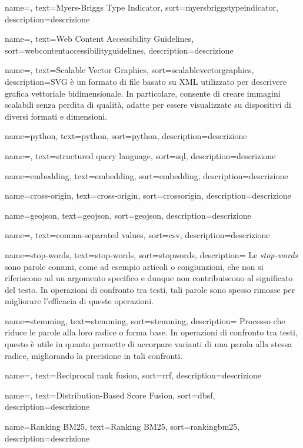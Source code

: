 {
    name=,
    text=Myers-Briggs Type Indicator,
    sort=myersbriggstypeindicator,
    description={descrizione}
}

 {
    name=,
    text=Web Content Accessibility Guidelines,
    sort=webcontentaccessibilityguidelines,
    description={descrizione}
}

 {
    name=,
    text=Scalable Vector Graphics,
    sort=scalablevectorgraphics,
    description={SVG è un formato di file basato su XML utilizzato per descrivere grafica vettoriale bidimensionale. In particolare, consente di creare immagini scalabili senza perdita di qualità, adatte per essere visualizzate su dispositivi di diversi formati e dimensioni.}
}

 {
    name=python,
    text=python,
    sort=python,
    description={descrizione}
}

 {
    name=,
    text=structured query language,
    sort=sql,
    description={descrizione}
}

 {
    name=embedding,
    text=embedding,
    sort=embedding,
    description={descrizione}
}

 {
    name=cross-origin,
    text=cross-origin,
    sort=crossorigin,
    description={descrizione}
}

 {
    name=geojson,
    text=geojson,
    sort=geojson,
    description={descrizione}
}

 {
    name=,
    text=comma-separated values,
    sort=csv,
    description={descrizione}
}

 {
    name=stop-words,
    text=stop-words,
    sort=stopwords,
    description={
        Le \emph{stop-words} sono parole comuni, come ad esempio articoli o congiunzioni, 
        che non si riferiscono ad un argomento specifico e dunque non contribuiscono al significato del testo.
        In operazioni di confronto tra testi, tali parole sono spesso rimosse per migliorare l'efficacia di queste operazioni. 
    }
}

 {
    name=stemming,
    text=stemming,
    sort=stemming,
    description={
        Processo che riduce le parole alla loro radice o forma base.
        In operazioni di confronto tra testi, questo è utile in quanto permette di accorpare varianti di una parola alla stessa radice, 
        migliorando la precisione in tali confronti.
    }
}

 {
    name=,
    text=Reciprocal rank fusion,
    sort=rrf,
    description={descrizione}
}

 {
    name=,
    text=Distribution-Based Score Fusion,
    sort=dbsf,
    description={descrizione}
}

 {
    name=Ranking BM25,
    text=Ranking BM25,
    sort=rankingbm25,
    description={descrizione}
}